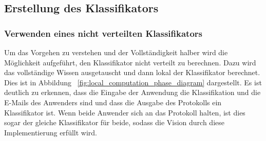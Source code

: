\documentclass{article}
\theoremstyle{definition}
\theoremstyle{remark}
\begin{document}
\subsection{Erstellung des Klassifikators}
\subsubsection{Verwenden eines nicht verteilten Klassifikators}
Um das Vorgehen zu verstehen und der Vollst\"andigkeit halber wird die
M\"oglichkeit aufgef\"uhrt, den Klassifikator nicht verteilt
zu berechnen. Dazu wird das vollst\"andige Wissen ausgetauscht und 
dann lokal der Klassifikator berechnet. Dies ist in Abbildung 
~\ref{fig:local_computation_phase_diagram} dargestellt. Es ist deutlich
zu erkennen, dass die Eingabe der Anwendung die Klassifikation und die E-Mails
des Anwenders sind und dass die Ausgabe des Protokolls ein Klassifikator ist.
Wenn beide Anwender sich an das Protokoll halten, ist dies sogar der gleiche
Klassifikator f\"ur beide, sodass die Vision durch diese Implementierung
erf\"ullt wird.
\end{document}
